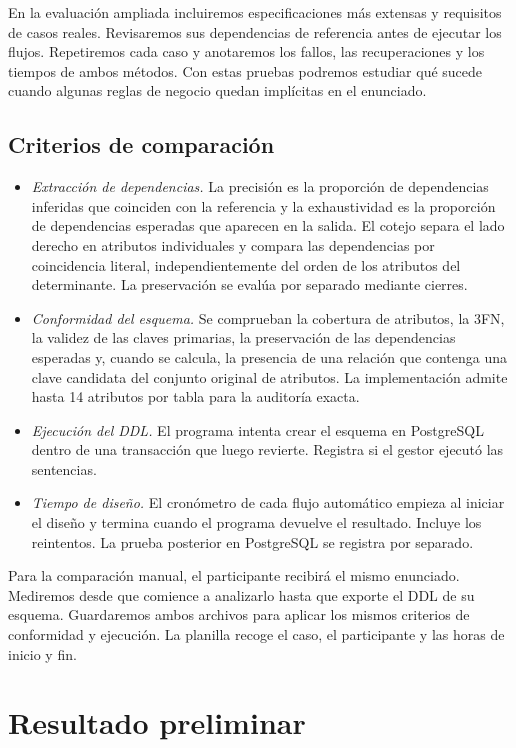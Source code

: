 \documentclass[conference]{IEEEtran}
\begin{document}
En la evaluación ampliada incluiremos especificaciones más extensas y requisitos de casos reales. Revisaremos sus dependencias de referencia antes de ejecutar los flujos. Repetiremos cada caso y anotaremos los fallos, las recuperaciones y los tiempos de ambos métodos. Con estas pruebas podremos estudiar qué sucede cuando algunas reglas de negocio quedan implícitas en el enunciado.

\subsection{Criterios de comparación}

\begin{itemize}
\item \textit{Extracción de dependencias.} La precisión es la proporción de dependencias inferidas que coinciden con la referencia y la exhaustividad es la proporción de dependencias esperadas que aparecen en la salida. El cotejo separa el lado derecho en atributos individuales y compara las dependencias por coincidencia literal, independientemente del orden de los atributos del determinante. La preservación se evalúa por separado mediante cierres.
\item \textit{Conformidad del esquema.} Se comprueban la cobertura de atributos, la 3FN, la validez de las claves primarias, la preservación de las dependencias esperadas y, cuando se calcula, la presencia de una relación que contenga una clave candidata del conjunto original de atributos. La implementación admite hasta 14 atributos por tabla para la auditoría exacta.
\item \textit{Ejecución del DDL.} El programa intenta crear el esquema en PostgreSQL dentro de una transacción que luego revierte. Registra si el gestor ejecutó las sentencias.
\item \textit{Tiempo de diseño.} El cronómetro de cada flujo automático empieza al iniciar el diseño y termina cuando el programa devuelve el resultado. Incluye los reintentos. La prueba posterior en PostgreSQL se registra por separado.
\end{itemize}

Para la comparación manual, el participante recibirá el mismo enunciado. Mediremos desde que comience a analizarlo hasta que exporte el DDL de su esquema. Guardaremos ambos archivos para aplicar los mismos criterios de conformidad y ejecución. La planilla recoge el caso, el participante y las horas de inicio y fin.

\section{Resultado preliminar}
\end{document}
